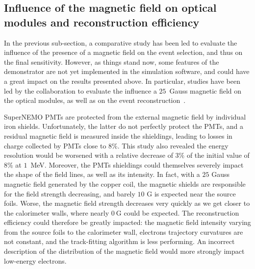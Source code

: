 
\subsection{Influence of the magnetic field on optical modules and reconstruction efficiency}

In the previous sub-section, a comparative study has been led to evaluate the influence of the presence of a magnetic field on the event selection, and thus on the final sensitivity.
However, as things stand now, some features of the demonstrator are not yet implemented in the simulation software, and could have a great impact on the results presented above.
In particular, studies have been led by the collaboration to evaluate the influence a $25$~Gauss magnetic field on the optical modules, as well as on the event reconstruction~\cite{CalvezThesis,internal:magnetic_field}.

SuperNEMO PMTs are protected from the external magnetic field by individual iron shields.
Unfortunately, the latter do not perfectly protect the PMTs, and a residual magnetic field is measured inside the shieldings, leading to losses in charge collected by PMTs close to $8\%$.
This study also revealed the energy resolution would be worsened with a relative decrease of $3\%$ of the initial value of $8\%$ at $1$~MeV.
Moreover, the PMTs shieldings could themselves severely impact the shape of the field lines, as well as its intensity.
In fact, with a $25$ Gauss magnetic field generated by the copper coil, the magnetic shields are responsible for the field strength decreasing, and barely $10$ G is expected near the source foils.
Worse, the magnetic field strength decreases very quickly as we get closer to the calorimeter walls, where nearly $0~$G could be expected.
The reconstruction efficiency could therefore be greatly impacted:
the magnetic field intensity varying from the source foils to the calorimeter wall, electrons trajectory curvatures are not constant, and the track-fitting algorithm is less performing.
An incorrect description of the distribution of the magnetic field would more strongly impact low-energy electrons.

